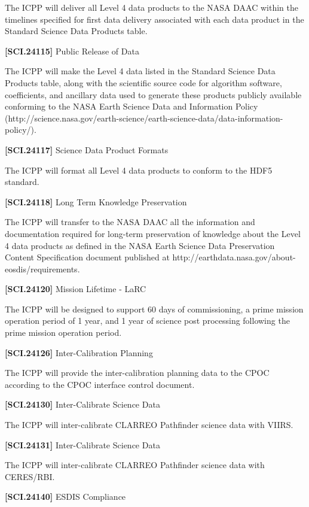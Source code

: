 \documentclass[12pt,oneside,oldfontcommands]{memoir}
\begin{document}
The \gls{ICPP} will deliver all Level 4 data products to the NASA \gls{DAAC} within the timelines specified for first data delivery associated with each data product in the Standard Science Data Products table.

\textbf{[SCI.24115]} Public Release of Data

The \gls{ICPP} will make the Level 4 data listed in the Standard Science Data Products table, along with the scientific source code for algorithm software, coefficients, and ancillary data used to generate these products publicly available conforming to the NASA Earth Science Data and Information Policy (http:\slash \slash science.nasa.gov\slash earth-science\slash earth-science-data\slash data-information-policy\slash ).

\textbf{[SCI.24117]} Science Data Product Formats

The \gls{ICPP} will format all Level 4 data products to conform to the HDF5 standard.

\textbf{[SCI.24118]} Long Term Knowledge Preservation

The \gls{ICPP} will transfer to the NASA \gls{DAAC} all the information and documentation required for long-term preservation of knowledge about the Level 4 data products as defined in the NASA Earth Science Data Preservation Content Specification document published at http:\slash \slash earthdata.nasa.gov\slash about-eosdis\slash requirements.

\textbf{[SCI.24120]} Mission Lifetime - \gls{LaRC}

The \gls{ICPP} will be designed to support 60 days of commissioning, a prime mission operation period of 1 year, and 1 year of science post processing following the prime mission operation period.

\textbf{[SCI.24126]} Inter-Calibration Planning

The \gls{ICPP} will provide the inter-calibration planning data to the \gls{CPOC} according to the \gls{CPOC} interface control document.

\textbf{[SCI.24130]} Inter-Calibrate Science Data

The \gls{ICPP} will inter-calibrate \gls{CLARREO} Pathfinder science data with \gls{VIIRS}.

\textbf{[SCI.24131]} Inter-Calibrate Science Data

The \gls{ICPP} will inter-calibrate \gls{CLARREO} Pathfinder science data with \gls{CERES}\slash \gls{RBI}.

\textbf{[SCI.24140]} \gls{ESDIS} Compliance
\end{document}
